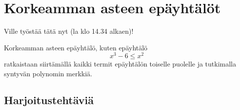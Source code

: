 \chapter{Korkeamman asteen epäyhtälöt}

Ville työstää tätä nyt (la klo 14.34 alkaen)!

Korkeamman asteen epäyhtälö, kuten epäyhtälö 
$$x^3 -6 \leq x^2 $$
ratkaistaan siirtämällä kaikki termit epäyhtälön toiselle puolelle ja tutkimalla
syntyvän polynomin merkkiä.


\section{Harjoitustehtäviä}
